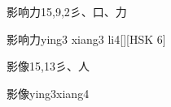 \begin{entry}{影响力}{15,9,2}{⼺、⼝、⼒}
  \begin{phonetics}{影响力}{ying3 xiang3 li4}[][HSK 6]
  \end{phonetics}
\end{entry}

\begin{entry}{影像}{15,13}{⼺、⼈}
  \begin{phonetics}{影像}{ying3xiang4}
  \end{phonetics}
\end{entry}


